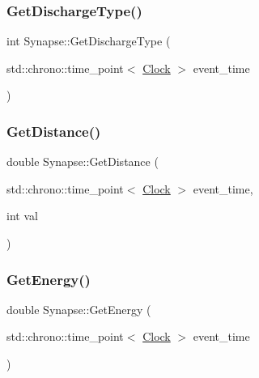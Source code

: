\subsubsection{\texorpdfstring{Get\+Discharge\+Type()}{GetDischargeType()}}
{\footnotesize\ttfamily int Synapse\+::\+Get\+Discharge\+Type (\begin{DoxyParamCaption}\item[{std\+::chrono\+::time\+\_\+point$<$ \mbox{\hyperlink{universe_8h_a0ef8d951d1ca5ab3cfaf7ab4c7a6fd80}{Clock}} $>$}]{event\+\_\+time }\end{DoxyParamCaption})\hspace{0.3cm}{\ttfamily [inline]}}

\mbox{\label{classSynapse_a0a0a100802e6662ecf18d39bf2a52d98}} 
\subsubsection{\texorpdfstring{Get\+Distance()}{GetDistance()}}
{\footnotesize\ttfamily double Synapse\+::\+Get\+Distance (\begin{DoxyParamCaption}\item[{std\+::chrono\+::time\+\_\+point$<$ \mbox{\hyperlink{universe_8h_a0ef8d951d1ca5ab3cfaf7ab4c7a6fd80}{Clock}} $>$}]{event\+\_\+time,  }\item[{int}]{val }\end{DoxyParamCaption})}

\mbox{\label{classSynapse_a58659a5134815f7a6e06eb5c60e9033f}} 
\subsubsection{\texorpdfstring{Get\+Energy()}{GetEnergy()}}
{\footnotesize\ttfamily double Synapse\+::\+Get\+Energy (\begin{DoxyParamCaption}\item[{std\+::chrono\+::time\+\_\+point$<$ \mbox{\hyperlink{universe_8h_a0ef8d951d1ca5ab3cfaf7ab4c7a6fd80}{Clock}} $>$}]{event\+\_\+time }\end{DoxyParamCaption})\hspace{0.3cm}{\ttfamily [inline]}}

\mbox{\label{classSynapse_a9c59a28a562e1f3f964b0196af21d00f}} 

